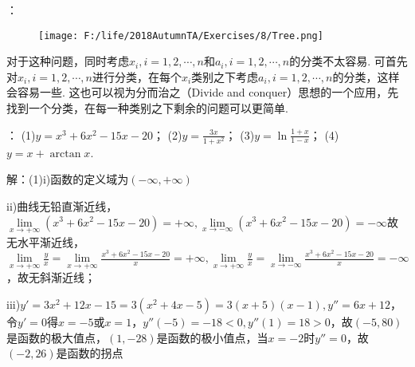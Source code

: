 \documentclass[12pt,UTF8]{ctexart}
\begin{document}
\begin{enumerate}
{：
\begin{figure}[H]
\begin{center}
\texttt{[image: F:/life/2018AutumnTA/Exercises/8/Tree.png]}
\end{center}
\end{figure}
对于这种问题，同时考虑$x_i,i=1,2,\cdots,n$和$a_i,i=1,2,\cdots,n$的分类不太容易. 可首先对$x_i,i=1,2,\cdots,n$进行分类，在每个$x_i$类别之下考虑$a_i,i=1,2,\cdots,n$的分类，这样会容易一些. 这也可以视为分而治之（Divide and conquer）思想的一个应用，先找到一个分类，在每一种类别之下剩余的问题可以更简单.
}

：
\newline
(1)$y=x^3+6x^2-15x-20$；
\newline
(2)$y=\frac{3x}{1+x^2}$；
\newline
(3)$y=\ln\frac{1+x}{1-x}$；
\newline
(4)$y=x+\arctan x$.

解：(1)i)函数的定义域为$(-\infty,+\infty)$

ii)曲线无铅直渐近线，$\lim\limits_{x\rightarrow+\infty}(x^3+6x^2-15x-20)=+\infty,\lim\limits_{x\rightarrow-\infty}(x^3+6x^2-15x-20)=-\infty$故无水平渐近线，$\lim\limits_{x\rightarrow+\infty}\frac yx=\lim\limits_{x\rightarrow+\infty}\frac{x^3+6x^2-15x-20}x=+\infty,\lim\limits_{x\rightarrow+\infty}\frac yx=\lim\limits_{x\rightarrow-\infty}\frac{x^3+6x^2-15x-20}x=-\infty$，故无斜渐近线；

iii)$y'=3x^2+12x-15=3(x^2+4x-5)=3(x+5)(x-1),y''=6x+12$，令$y'=0$得$x=-5$或$x=1$，$y''(-5)=-18<0,y''(1)=18>0$，故$(-5,80)$是函数的极大值点，$(1,-28)$是函数的极小值点，当$x=-2$时$y''=0$，故$(-2,26)$是函数的拐点


\end{enumerate}
\end{document}
